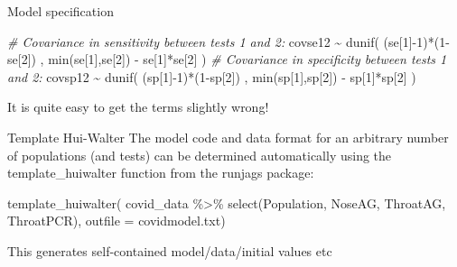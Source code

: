 \documentclass[
  ignorenonframetext,
  aspectratio=169,
]{beamer}
\newenvironment{Shaded}{\begin{snugshade}}{\end{snugshade}}
\newcommand{\AttributeTok}[1]{\textcolor[rgb]{0.77,0.63,0.00}{#1}}
\newcommand{\CommentTok}[1]{\textcolor[rgb]{0.56,0.35,0.01}{\textit{#1}}}
\newcommand{\DecValTok}[1]{\textcolor[rgb]{0.00,0.00,0.81}{#1}}
\newcommand{\FunctionTok}[1]{\textcolor[rgb]{0.00,0.00,0.00}{#1}}
\newcommand{\NormalTok}[1]{#1}
\newcommand{\SpecialCharTok}[1]{\textcolor[rgb]{0.00,0.00,0.00}{#1}}
\newcommand{\StringTok}[1]{\textcolor[rgb]{0.31,0.60,0.02}{#1}}
\begin{document}
\begin{frame}[fragile]{Model specification}
\begin{Shaded}
\begin{Highlighting}[]
\CommentTok{\# Covariance in sensitivity between tests 1 and 2:}
\NormalTok{covse12 }\SpecialCharTok{\textasciitilde{}} \FunctionTok{dunif}\NormalTok{( (se[}\DecValTok{1}\NormalTok{]}\SpecialCharTok{{-}}\DecValTok{1}\NormalTok{)}\SpecialCharTok{*}\NormalTok{(}\DecValTok{1}\SpecialCharTok{{-}}\NormalTok{se[}\DecValTok{2}\NormalTok{]) , }
                     \FunctionTok{min}\NormalTok{(se[}\DecValTok{1}\NormalTok{],se[}\DecValTok{2}\NormalTok{]) }\SpecialCharTok{{-}}\NormalTok{ se[}\DecValTok{1}\NormalTok{]}\SpecialCharTok{*}\NormalTok{se[}\DecValTok{2}\NormalTok{] )}
\CommentTok{\# Covariance in specificity between tests 1 and 2:}
\NormalTok{covsp12 }\SpecialCharTok{\textasciitilde{}} \FunctionTok{dunif}\NormalTok{( (sp[}\DecValTok{1}\NormalTok{]}\SpecialCharTok{{-}}\DecValTok{1}\NormalTok{)}\SpecialCharTok{*}\NormalTok{(}\DecValTok{1}\SpecialCharTok{{-}}\NormalTok{sp[}\DecValTok{2}\NormalTok{]) , }
                     \FunctionTok{min}\NormalTok{(sp[}\DecValTok{1}\NormalTok{],sp[}\DecValTok{2}\NormalTok{]) }\SpecialCharTok{{-}}\NormalTok{ sp[}\DecValTok{1}\NormalTok{]}\SpecialCharTok{*}\NormalTok{sp[}\DecValTok{2}\NormalTok{] )}
\end{Highlighting}
\end{Shaded}

\normalsize

\pause

It is quite easy to get the terms slightly wrong!
\end{frame}

\begin{frame}[fragile]{Template Hui-Walter}
\protect\hypertarget{template-hui-walter}{}
The model code and data format for an arbitrary number of populations
(and tests) can be determined automatically using the
template\_huiwalter function from the runjags package:

\scriptsize

\begin{Shaded}
\begin{Highlighting}[]
\FunctionTok{template\_huiwalter}\NormalTok{(}
\NormalTok{  covid\_data }\SpecialCharTok{\%\textgreater{}\%} \FunctionTok{select}\NormalTok{(Population, NoseAG, ThroatAG, ThroatPCR), }
  \AttributeTok{outfile =} \StringTok{\textquotesingle{}covidmodel.txt\textquotesingle{}}\NormalTok{)}
\end{Highlighting}
\end{Shaded}

\normalsize

This generates self-contained model/data/initial values etc
\end{frame}
\end{document}
